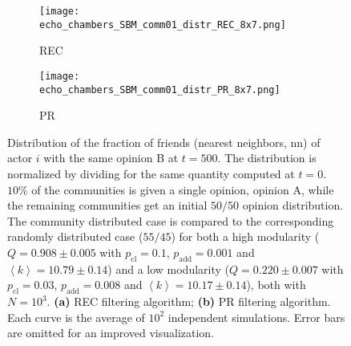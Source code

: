\documentclass[11 pt , letterpaper , twoside , openright]{book}
\begin{document}
\begin{figure}[H]
  \begin{subfigure}[b]{0.49\textwidth}
    \caption{REC}
  	\texttt{[image: echo\_chambers\_SBM\_comm01\_distr\_REC\_8x7.png]}
    \label{rec_comm_echo}
  \end{subfigure}
  \begin{subfigure}[b]{0.49\textwidth}
    \caption{PR}
  	\texttt{[image: echo\_chambers\_SBM\_comm01\_distr\_PR\_8x7.png]}
    \label{pr_comm_echo}
  \end{subfigure}
  \captionsetup{format=plain}
  \caption[Distribution of the fraction of friends (nearest neighbors, nn) of actor $i$ with the same opinion B at $t = 500$. $10 \%$ of the communities is given a single opinion, opinion A, while the remaining communities get an initial $50/50$ opinion distribution. The community distributed case is compared to the corresponding randomly distributed case ($55/45$) for both a high modularity and a low modularity network. Results for the REC and PR filtering algorithms.]{Distribution of the fraction of friends (nearest neighbors, nn) of actor $i$ with the same opinion B at $t = 500$. The distribution is normalized by dividing for the same quantity computed at $t=0$. $10 \%$ of the communities is given a single opinion, opinion A, while the remaining communities get an initial $50/50$ opinion distribution. The community distributed case is compared to the corresponding randomly distributed case ($55/45$) for both a high modularity ($Q = 0.908 \pm 0.005$ with $p_{\text{cl}} = 0.1$, $p_{\text{add}} = 0.001$ and $\left<k\right> = 10.79 \pm 0.14$) and a low modularity ($Q = 0.220 \pm 0.007$ with $p_{\text{cl}} = 0.03$, $p_{\text{add}} = 0.008$ and $\left<k\right> = 10.17 \pm 0.14$), both with $N=10^3$. \textbf{(a)} REC filtering algorithm; \textbf{(b)} PR filtering algorithm. Each curve is the average of $10^2$ independent simulations. Error bars are omitted for an improved visualization.}
\label{echo_01_commOp0_other_50-50}
\end{figure}
\noindent
\end{document}
